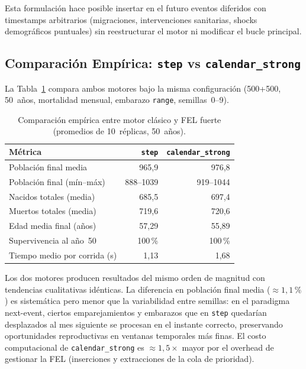 \documentclass{llncs}
\begin{document}
Esta formulación hace posible insertar en el futuro eventos diferidos con
timestamps arbitrarios (migraciones, intervenciones sanitarias, shocks
demográficos puntuales) sin reestructurar el motor ni modificar el bucle
principal.

\subsection{Comparación Empírica: \texttt{step} vs \texttt{calendar\_strong}}

La Tabla~\ref{tab:step_vs_strong} compara ambos motores bajo la misma
configuración (500+500, 50~años, mortalidad mensual, embarazo \texttt{range},
semillas~0--9).

\begin{table}[H]
\caption{Comparación empírica entre motor clásico y FEL fuerte
         (promedios de 10~réplicas, 50~años).}
\label{tab:step_vs_strong}
\centering
\begin{tabular}{lrr}
\toprule
\textbf{Métrica} & \textbf{\texttt{step}} & \textbf{\texttt{calendar\_strong}} \\
\midrule
Población final media        & 965{,}9 & 976{,}8 \\
Población final (mín--máx)   & 888--1039 & 919--1044 \\
Nacidos totales (media)      & 685{,}5 & 697{,}4 \\
Muertos totales (media)      & 719{,}6 & 720{,}6 \\
Edad media final (años)      & 57{,}29 & 55{,}89 \\
Supervivencia al año~50      & 100\,\% & 100\,\% \\
Tiempo medio por corrida (s) & 1{,}13 & 1{,}68 \\
\bottomrule
\end{tabular}
\end{table}

Los dos motores producen resultados del mismo orden de magnitud con
tendencias cualitativas idénticas.
La diferencia en población final media ($\approx 1{,}1\,\%$) es sistemática
pero menor que la variabilidad entre semillas: en el paradigma next-event,
ciertos emparejamientos y embarazos que en \texttt{step} quedarían
desplazados al mes siguiente se procesan en el instante correcto, preservando
oportunidades reproductivas en ventanas temporales más finas.
El costo computacional de \texttt{calendar\_strong} es $\approx 1{,}5\times$
mayor por el overhead de gestionar la FEL (inserciones y extracciones de la
cola de prioridad).
\end{document}
